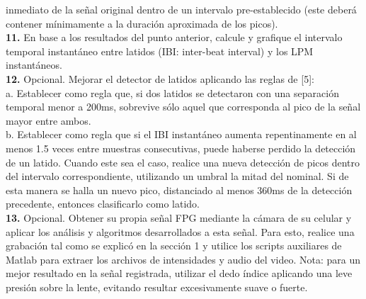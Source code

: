 inmediato de la señal original dentro de un intervalo pre-establecido (este deberá
contener mínimamente a la duración aproximada de los picos).\\
\textbf{11.} En base a los resultados del punto anterior, calcule y grafique el intervalo temporal
instantáneo entre latidos (IBI: inter-beat interval) y los LPM instantáneos.\\
\textbf{12.} Opcional. Mejorar el detector de latidos aplicando las reglas de [5]:\\
a. Establecer como regla que, si dos latidos se detectaron con una separación
temporal menor a 200ms, sobrevive sólo aquel que corresponda al pico de la
señal mayor entre ambos.\\
b. Establecer como regla que si el IBI instantáneo aumenta repentinamente en al
menos 1.5 veces entre muestras consecutivas, puede haberse perdido la
detección de un latido. Cuando este sea el caso, realice una nueva detección
de picos dentro del intervalo correspondiente, utilizando un umbral la mitad
del nominal. Si de esta manera se halla un nuevo pico, distanciado al menos
360ms de la detección precedente, entonces clasificarlo como latido.\\
\textbf{13.} Opcional. Obtener su propia señal FPG mediante la cámara de su celular y aplicar los
análisis y algoritmos desarrollados a esta señal. Para esto, realice una grabación tal
como se explicó en la sección 1 y utilice los scripts auxiliares de Matlab para extraer
los archivos de intensidades y audio del video. Nota: para un mejor resultado en la
señal registrada, utilizar el dedo índice aplicando una leve presión sobre la lente,
evitando resultar excesivamente suave o fuerte.\\
